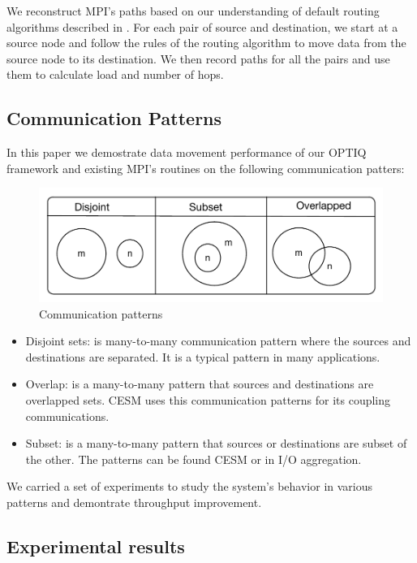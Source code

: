 We reconstruct MPI's paths based on our understanding of default routing algorithms described in \cite{Chen:BGQ}. For each pair of source and destination, we start at a source node and follow the rules of the routing algorithm to move data from the source node to its destination. We then record paths for all the pairs and use them to calculate load and number of hops. 

\subsection{Communication Patterns}
In this paper we demostrate data movement performance of our OPTIQ framework and existing MPI's routines on the following communication patters:

\begin{figure}[ht]
\vspace{-0.1in}
\centering
\includegraphics[scale=0.55]{figures/patterns.pdf}
\vspace{-0.1in}
\caption{Communication patterns}
\vspace{-0.1in}
\label{fig:patterns}
\end{figure}

\begin{itemize}
\item Disjoint sets: is many-to-many communication pattern where the sources and destinations are separated. It is a typical pattern in many applications.
\item Overlap: is a many-to-many pattern that sources and destinations are overlapped sets. CESM uses this communication patterns for its coupling communications.
\item Subset: is a many-to-many pattern that sources or destinations are subset of the other. The patterns can be found CESM or in I/O aggregation.
\end{itemize}

We carried a set of experiments to study the system's behavior in various patterns and demontrate throughput improvement.

\subsection{Experimental results}

